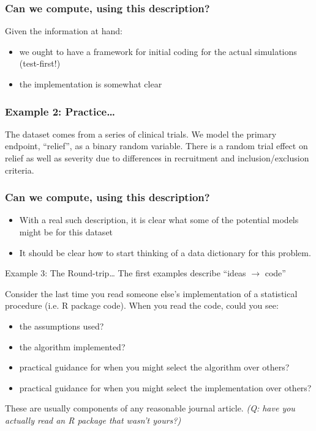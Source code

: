 \documentclass{beamer}
\begin{document}
\begin{frame}
  \frametitle{Can we compute, using this description?}
  Given the information at hand:
  \begin{itemize}
  \item we ought to have a framework for initial coding for the
    actual simulations (test-first!)
  \item the implementation is somewhat clear
  \end{itemize}
\end{frame}


\begin{frame}
  \frametitle{Example 2: Practice\ldots} 
  \label{example2}
  The dataset comes from a series of clinical trials.  We model the
  primary endpoint, ``relief'', as a binary random variable.  There is a random
  trial effect on relief as well as severity due to differences in
  recruitment and inclusion/exclusion criteria.
\end{frame}

\begin{frame}
  \frametitle{Can we compute, using this description?}
  \begin{itemize}
  \item With a real such description, it is clear what some of the
    potential models might be for this dataset
  \item It should be clear how to start thinking of a data dictionary
    for this problem.
  \end{itemize}
\end{frame}

\begin{frame}{Example 3: The Round-trip\ldots} 
  \label{example3}
  The first examples describe ``ideas $\rightarrow$ code''

  Consider the last time you read someone else's implementation of a
  statistical procedure (i.e. R package code).  When you read the
  code, could you see:
  \begin{itemize}
  \item the assumptions used?
  \item the algorithm implemented?
  \item practical guidance for when you might select the algorithm
    over others? 
  \item practical guidance for when you might select the
    implementation over others? 
  \end{itemize}
  These are usually components of any reasonable journal article.
  \textit{(Q: have you actually read an R package that wasn't yours?)}
\end{frame}
\end{document}
